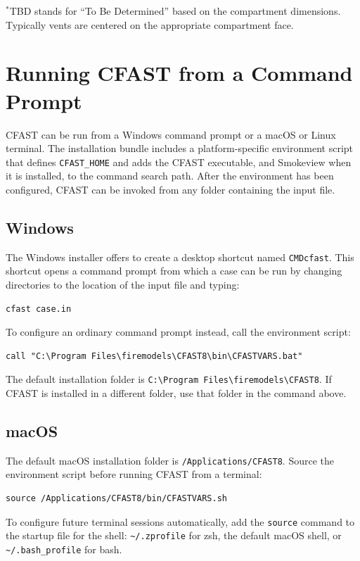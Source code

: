 \noindent 
$^*$TBD stands for ``To Be Determined'' based on the compartment dimensions. Typically vents are centered on the appropriate compartment face.







\chapter{Running CFAST from a Command Prompt}

CFAST can be run from a Windows command prompt or a macOS or Linux terminal. The installation bundle includes a platform-specific environment script that defines \texttt{CFAST\_HOME} and adds the CFAST executable, and Smokeview when it is installed, to the command search path. After the environment has been configured, CFAST can be invoked from any folder containing the input file.

\section{Windows}

The Windows installer offers to create a desktop shortcut named \texttt{CMDcfast}. This shortcut opens a command prompt from which a case can be run by changing directories to the location of the input file and typing:
\begin{lstlisting}
cfast case.in
\end{lstlisting}
To configure an ordinary command prompt instead, call the environment script:
\begin{lstlisting}
call "C:\Program Files\firemodels\CFAST8\bin\CFASTVARS.bat"
\end{lstlisting}
The default installation folder is \texttt{C:\textbackslash Program Files\textbackslash firemodels\textbackslash CFAST8}. If CFAST is installed in a different folder, use that folder in the command above.

\section{macOS}

The default macOS installation folder is \texttt{/Applications/CFAST8}. Source the environment script before running CFAST from a terminal:
\begin{lstlisting}
source /Applications/CFAST8/bin/CFASTVARS.sh
\end{lstlisting}
To configure future terminal sessions automatically, add the \texttt{source} command to the startup file for the shell: \texttt{\textasciitilde/.zprofile} for zsh, the default macOS shell, or \texttt{\textasciitilde/.bash\_profile} for bash.


